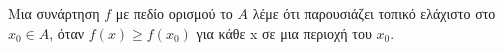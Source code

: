 Μια συνάρτηση $f$ με πεδίο ορισμού το $ A $ λέμε ότι παρουσιάζει τοπικό ελάχιστο στο $ x_0\in A $, όταν $ f(x)\geq f(x_0) $ για κάθε x σε μια περιοχή του $ x_0 $.
